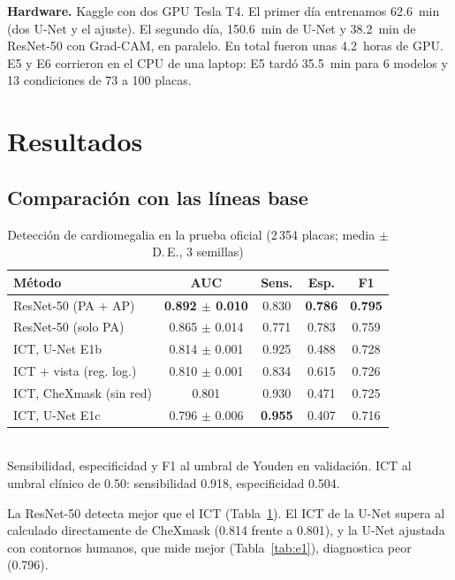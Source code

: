 \documentclass[conference]{IEEEtran}
\begin{document}
\textbf{Hardware.} Kaggle con dos GPU Tesla T4. El primer día entrenamos 62.6~min (dos U-Net y el ajuste). El segundo
día, 150.6~min de U-Net y 38.2~min de ResNet-50 con Grad-CAM, en paralelo. En total fueron unas 4.2~horas de GPU. E5 y E6
corrieron en el CPU de una laptop: E5 tardó 35.5~min para 6 modelos y 13 condiciones de 73 a 100 placas.

\section{Resultados}\label{sec:res}

\subsection{Comparación con las líneas base}

\begin{table}[t]
\caption{Detección de cardiomegalia en la prueba oficial (2\,354 placas; media $\pm$ D.\,E., 3 semillas)}\label{tab:e2}
\centering
\setlength{\tabcolsep}{4pt}
\begin{tabular}{lcccc}
\toprule
Método & AUC & Sens. & Esp. & F1 \\
\midrule
ResNet-50 (PA + AP) & \textbf{0.892 $\pm$ 0.010} & 0.830 & \textbf{0.786} & \textbf{0.795} \\
ResNet-50 (solo PA) & 0.865 $\pm$ 0.014 & 0.771 & 0.783 & 0.759 \\
ICT, U-Net E1b & 0.814 $\pm$ 0.001 & 0.925 & 0.488 & 0.728 \\
ICT + vista (reg. log.) & 0.810 $\pm$ 0.001 & 0.834 & 0.615 & 0.726 \\
ICT, CheXmask (sin red) & 0.801 & 0.930 & 0.471 & 0.725 \\
ICT, U-Net E1c & 0.796 $\pm$ 0.006 & \textbf{0.955} & 0.407 & 0.716 \\
\bottomrule
\end{tabular}
\\[2pt]{\footnotesize Sensibilidad, especificidad y F1 al umbral de Youden en validación. ICT al umbral clínico de
0.50: sensibilidad 0.918, especificidad 0.504.}
\end{table}

La ResNet-50 detecta mejor que el ICT (Tabla~\ref{tab:e2}). El ICT de la U-Net supera al calculado directamente de
CheXmask (0.814 frente a 0.801), y la U-Net ajustada con contornos humanos, que mide mejor (Tabla~\ref{tab:e1}),
diagnostica peor (0.796).
\end{document}
